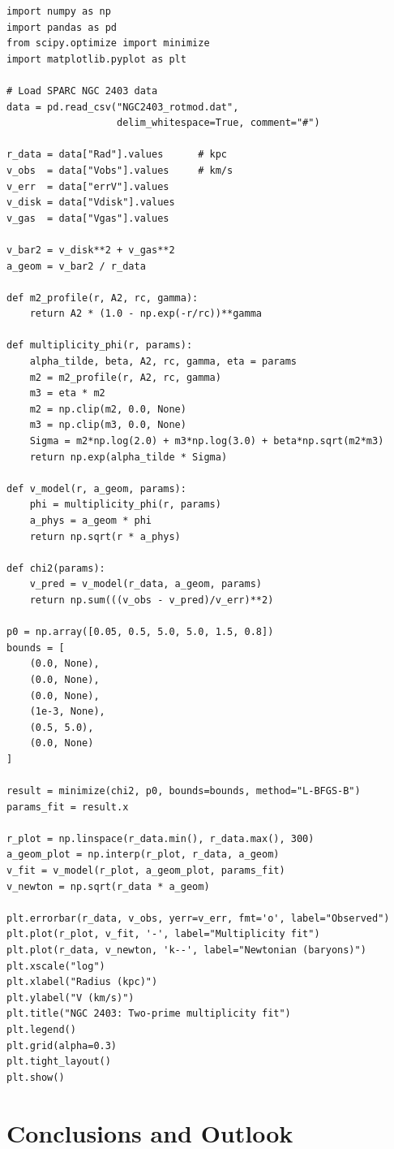 \documentclass[11pt]{article}
\begin{document}
\begin{verbatim}
import numpy as np
import pandas as pd
from scipy.optimize import minimize
import matplotlib.pyplot as plt

# Load SPARC NGC 2403 data
data = pd.read_csv("NGC2403_rotmod.dat",
                   delim_whitespace=True, comment="#")

r_data = data["Rad"].values      # kpc
v_obs  = data["Vobs"].values     # km/s
v_err  = data["errV"].values
v_disk = data["Vdisk"].values
v_gas  = data["Vgas"].values

v_bar2 = v_disk**2 + v_gas**2
a_geom = v_bar2 / r_data

def m2_profile(r, A2, rc, gamma):
    return A2 * (1.0 - np.exp(-r/rc))**gamma

def multiplicity_phi(r, params):
    alpha_tilde, beta, A2, rc, gamma, eta = params
    m2 = m2_profile(r, A2, rc, gamma)
    m3 = eta * m2
    m2 = np.clip(m2, 0.0, None)
    m3 = np.clip(m3, 0.0, None)
    Sigma = m2*np.log(2.0) + m3*np.log(3.0) + beta*np.sqrt(m2*m3)
    return np.exp(alpha_tilde * Sigma)

def v_model(r, a_geom, params):
    phi = multiplicity_phi(r, params)
    a_phys = a_geom * phi
    return np.sqrt(r * a_phys)

def chi2(params):
    v_pred = v_model(r_data, a_geom, params)
    return np.sum(((v_obs - v_pred)/v_err)**2)

p0 = np.array([0.05, 0.5, 5.0, 5.0, 1.5, 0.8])
bounds = [
    (0.0, None),
    (0.0, None),
    (0.0, None),
    (1e-3, None),
    (0.5, 5.0),
    (0.0, None)
]

result = minimize(chi2, p0, bounds=bounds, method="L-BFGS-B")
params_fit = result.x

r_plot = np.linspace(r_data.min(), r_data.max(), 300)
a_geom_plot = np.interp(r_plot, r_data, a_geom)
v_fit = v_model(r_plot, a_geom_plot, params_fit)
v_newton = np.sqrt(r_data * a_geom)

plt.errorbar(r_data, v_obs, yerr=v_err, fmt='o', label="Observed")
plt.plot(r_plot, v_fit, '-', label="Multiplicity fit")
plt.plot(r_data, v_newton, 'k--', label="Newtonian (baryons)")
plt.xscale("log")
plt.xlabel("Radius (kpc)")
plt.ylabel("V (km/s)")
plt.title("NGC 2403: Two-prime multiplicity fit")
plt.legend()
plt.grid(alpha=0.3)
plt.tight_layout()
plt.show()
\end{verbatim}

\section{Conclusions and Outlook}
\end{document}

